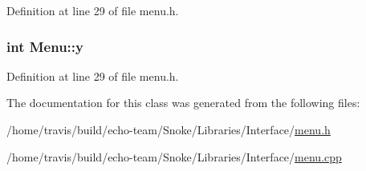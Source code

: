 Definition at line 29 of file menu.\-h.

\hypertarget{class_menu_a658438f1d47ccb1cfb78b14fe3e09b52}{
\subsubsection[{y}]{\setlength{\rightskip}{0pt plus 5cm}int Menu\-::y\hspace{0.3cm}{\ttfamily [private]}}}\label{class_menu_a658438f1d47ccb1cfb78b14fe3e09b52}


Definition at line 29 of file menu.\-h.



The documentation for this class was generated from the following files\-:\begin{DoxyCompactItemize}
\item 
/home/travis/build/echo-\/team/\-Snoke/\-Libraries/\-Interface/\hyperlink{menu_8h}{menu.\-h}\item 
/home/travis/build/echo-\/team/\-Snoke/\-Libraries/\-Interface/\hyperlink{menu_8cpp}{menu.\-cpp}\end{DoxyCompactItemize}
